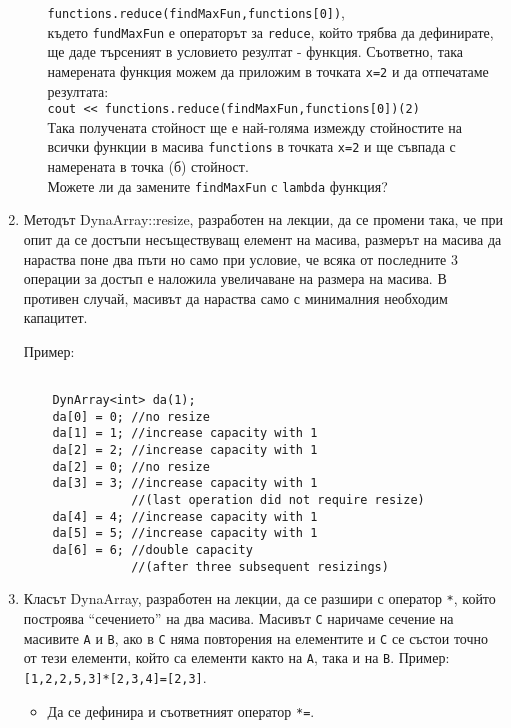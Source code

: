 \documentclass[12pt,a4paper]{article}
\begin{document}
\begin{enumerate}
\begin{enumerate}
\begin{mdframed}[hidealllines=true,backgroundcolor=gray!20]
				\texttt{functions.reduce(findMaxFun,functions[0])},\\

				където \texttt{fundMaxFun} е операторът за \texttt{reduce}, който трябва да дефинирате, ще даде търсеният в условието резултат - функция. Съответно, така намерената функция можем да приложим в точката \texttt{x=2} и да отпечатаме резултата:\\

				\texttt{cout << functions.reduce(findMaxFun,functions[0])(2)}\\

				Така получената стойност ще е най-голяма измежду стойностите на всички функции в масива \texttt{functions} в точката \texttt{x=2} и ще съвпада с намерената в точка (б) стойност.\\

				Можете ли да замените \texttt{findMaxFun} с \texttt{lambda} функция?


		\end{mdframed}

	\end{enumerate}

	\item Методът DynaArray::resize, разработен на лекции, да се промени така, че при опит да се достъпи несъществуващ елемент на масива, размерът на масива да нараства поне два пъти но само при условие, че всяка от последните 3 операции за достъп е наложила увеличаване на размера на масива. В противен случай, масивът да нараства само с минималния необходим капацитет.

	\begin{mdframed}[hidealllines=true,backgroundcolor=gray!20]
	Пример:
	\begin{lstlisting}

	DynArray<int> da(1);
	da[0] = 0; //no resize
	da[1] = 1; //increase capacity with 1
	da[2] = 2; //increase capacity with 1
	da[2] = 0; //no resize
	da[3] = 3; //increase capacity with 1
	           //(last operation did not require resize)
	da[4] = 4; //increase capacity with 1
	da[5] = 5; //increase capacity with 1
	da[6] = 6; //double capacity
	           //(after three subsequent resizings)

	\end{lstlisting}
	\end{mdframed}

	\item Класът DynaArray, разработен на лекции, да се разшири с оператор \texttt{*}, който построява ``сечението'' на два масива. Масивът \texttt{C} наричаме сечение на масивите \texttt{A} и \texttt{B}, ако в \texttt{C} няма повторения на елементите и \texttt{C} се състои точно от тези елементи, който са елементи както на \texttt{A}, така и на \texttt{B}. Пример: \texttt{[1,2,2,5,3]*[2,3,4]=[2,3]}.
	\begin{itemize}
	\item Да се дефинира и съответният оператор \texttt{*=}.
	\end{itemize}

\end{enumerate}


	\vspace{20px}
\end{document}
